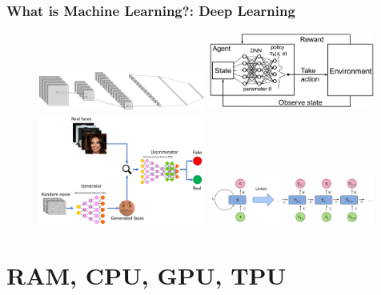 \documentclass[11pt]{beamer}
\begin{document}
\begin{frame}
	\frametitle{What is Machine Learning?: Deep Learning}
	\begin{figure}
		\includegraphics[width=55mm,scale=0.5]{cnn}\hspace{2mm}
		\includegraphics[width=55mm,scale=0.5]{drl}
		\\[\smallskipamount]
		\includegraphics[width=55mm,scale=0.5]{gan}\hspace{2mm}
		\includegraphics[width=55mm,scale=0.5]{rnn}
	\end{figure}
\end{frame}

\section{RAM, CPU, GPU, TPU}
\end{document}
